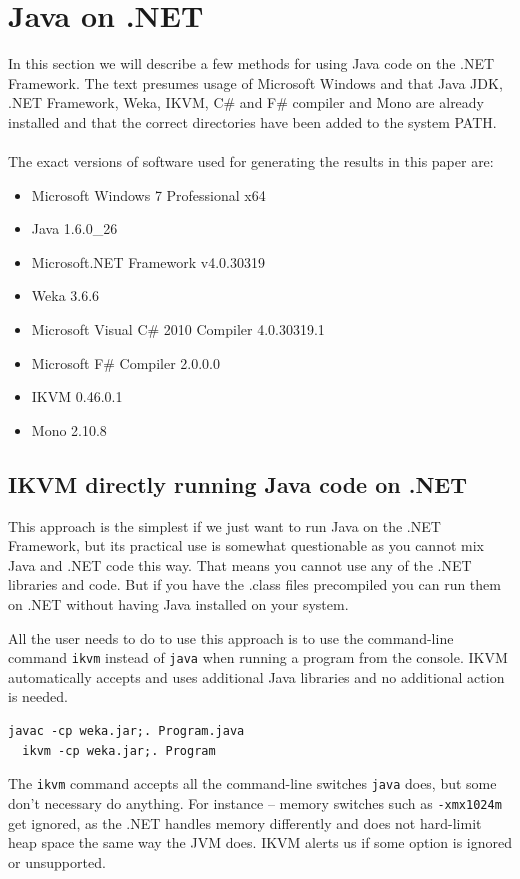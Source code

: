 \documentclass[journal]{IEEEtran/IEEEtran}
\newcommand\ver[1]{%
{\texttt{#1}}}
\newcommand\subsect[1]{\subsection{#1}\noindent}
\begin{document}
\section{Java on .NET}
In this section we will describe a few methods for using Java code on the .NET Framework. The text presumes usage of Microsoft Windows and that Java JDK, .NET Framework, Weka, IKVM, C\# and F\# compiler and Mono are already installed and that the correct directories have been added to the system PATH.\\ \ \\
The exact versions of software used for generating the results in this paper are:
\begin{itemize}
\item Microsoft Windows 7 Professional x64
\item Java 1.6.0\_26
\item Microsoft.NET Framework v4.0.30319
\item Weka 3.6.6
\item Microsoft Visual C\# 2010 Compiler 4.0.30319.1
\item Microsoft F\# Compiler 2.0.0.0
\item IKVM 0.46.0.1
\item Mono 2.10.8
\end{itemize}
\subsect{IKVM directly running Java code on .NET}This approach is the simplest if we just want to run Java on the .NET Framework, but its practical use is somewhat questionable as you cannot mix Java and .NET code this way. That means you cannot use any of the .NET libraries and code. But if you have the .class files precompiled you can run them on .NET without having Java installed on your system.

All the user needs to do to use this approach is to use the command-line command \ver{ikvm} instead of \ver{java} when running a program from the console. IKVM automatically accepts and uses additional Java libraries and no additional action is needed.
\begin{lstlisting}[title={Weka example}]
  javac -cp weka.jar;. Program.java
  ikvm -cp weka.jar;. Program 
\end{lstlisting}
The \ver{ikvm} command accepts all the command-line switches \ver{java} does, but some don't necessary do anything. For instance -- memory switches such as \ver{-xmx1024m} get ignored, as the .NET handles memory differently and does not hard-limit heap space the same way the JVM does. IKVM alerts us if some option is ignored or unsupported.
\end{document}

